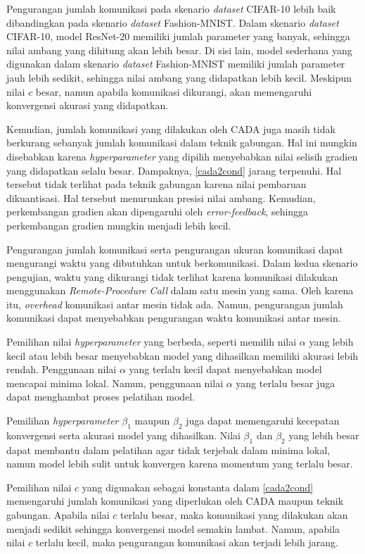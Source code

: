 Pengurangan jumlah komunikasi pada skenario \emph{dataset} CIFAR-10 lebih baik dibandingkan pada skenario \emph{dataset} Fashion-MNIST. Dalam skenario \emph{dataset} CIFAR-10, model ResNet-20 memiliki jumlah parameter yang banyak, sehingga nilai ambang yang dihitung akan lebih besar. Di sisi lain, model sederhana yang digunakan dalam skenario \emph{dataset} Fashion-MNIST memiliki jumlah parameter jauh lebih sedikit, sehingga nilai ambang yang didapatkan lebih kecil. Meskipun nilai $c$ besar, namun apabila komunikasi dikurangi, akan memengaruhi konvergensi akurasi yang didapatkan.

Kemudian, jumlah komunikasi yang dilakukan oleh CADA juga masih tidak berkurang sebanyak jumlah komunikasi dalam teknik gabungan. Hal ini mungkin disebabkan karena \emph{hyperparameter} yang dipilih menyebabkan nilai selisih gradien yang didapatkan selalu besar. Dampaknya, \autoref{cada2cond} jarang terpenuhi. Hal tersebut tidak terlihat pada teknik gabungan karena nilai pembaruan dikuantisasi. Hal tersebut menurunkan presisi nilai ambang. Kemudian, perkembangan gradien akan dipengaruhi oleh \emph{error-feedback}, sehingga perkembangan gradien mungkin menjadi lebih kecil.

Pengurangan jumlah komunikasi serta pengurangan ukuran komunikasi dapat mengurangi waktu yang dibutuhkan untuk berkomunikasi. Dalam kedua skenario pengujian, waktu yang dikurangi tidak terlihat karena komunikasi dilakukan menggunakan \textit{Remote-Procedure Call} dalam satu mesin yang sama. Oleh karena itu, \emph{overhead} komunikasi antar mesin tidak ada. Namun, pengurangan jumlah komunikasi dapat menyebabkan pengurangan waktu komunikasi antar mesin.

Pemilihan nilai \emph{hyperparameter} yang berbeda, seperti memilih nilai $\alpha$ yang lebih kecil atau lebih besar menyebabkan model yang dihasilkan memiliki akurasi lebih rendah. Penggunaan nilai $\alpha$ yang terlalu kecil dapat menyebabkan model mencapai minima lokal. Namun, penggunaan nilai $\alpha$ yang terlalu besar juga dapat menghambat proses pelatihan model.

Pemilihan \emph{hyperparameter} $\beta_1$ maupun $\beta_2$ juga dapat memengaruhi kecepatan konvergensi serta akurasi model yang dihasilkan. Nilai $\beta_1$ dan $\beta_2$ yang lebih besar dapat membantu dalam pelatihan agar tidak terjebak dalam minima lokal, namun model lebih sulit untuk konvergen karena momentum yang terlalu besar.

Pemilihan nilai $c$ yang digunakan sebagai konstanta dalam \autoref{cada2cond} memengaruhi jumlah komunikasi yang diperlukan oleh CADA maupun teknik gabungan. Apabila nilai $c$ terlalu besar, maka komunikasi yang dilakukan akan menjadi sedikit sehingga konvergensi model semakin lambat. Namun, apabila nilai $c$ terlalu kecil, maka pengurangan komunikasi akan terjadi lebih jarang.

